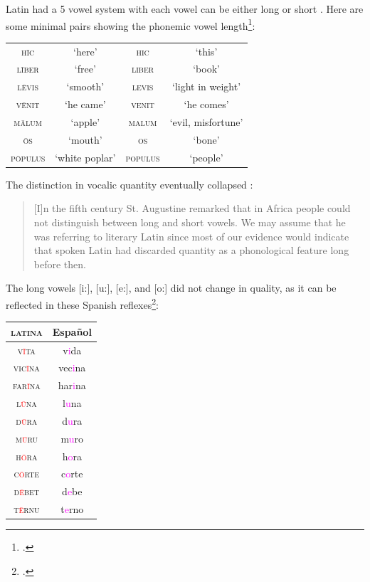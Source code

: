 \documentclass{report}[12pt]
\begin{document}
Latin had a 5 vowel system with each vowel can be either long or short \parencites[p.~6]{romance_his}[p.~44]{penny_spanish}[p.~70]{lloyd_spanish}. Here are some minimal pairs showing the phonemic vowel length\footcite[p.~45]{penny_spanish}:
\begin{center}
  \begin{tabular}{c c c c}
    \textsc{h\={i}c} & `here' & \textsc{hic} & `this' \\
    \textsc{l\={i}ber} & `free' & \textsc{liber} & `book' \\
    \textsc{l\={e}vis} & `smooth' & \textsc{levis} & `light in weight' \\
    \textsc{v\={e}nit} & `he came' & \textsc{venit} & `he comes' \\
    \textsc{m\={a}lum} & `apple' & \textsc{malum} & `evil, misfortune' \\
    \textsc{\={o}s} & `mouth' & \textsc{os} & `bone' \\
    \textsc{p\={o}pulus} & `white poplar' & \textsc{populus} & `people' \\
  \end{tabular}
\end{center}
The distinction in vocalic quantity eventually collapsed \parencite[p.~112]{lloyd_spanish}:
\begin{quote}
  [I]n the fifth century St. Augustine remarked that in Africa people could not distinguish between long and short vowels. We may assume that he was referring to literary Latin since most of our evidence would indicate that spoken Latin had discarded quantity as a phonological feature long before then.
\end{quote}
The long vowels [i:], [u:], [e:], and [o:] did not change in quality, as it can be reflected in these Spanish reflexes\footcite[p.~12]{romance_his}:
\begin{center}
  \begin{tabular}{c c}
    \textsc{latina} & Español \\
    \hline
    \textsc{v\textcolor{red}{\={i}}ta} & v\textcolor{magenta}{i}da \\
    \textsc{vic\textcolor{red}{\={i}}na} & vec\textcolor{magenta}{i}na \\
    \textsc{far\textcolor{red}{\={i}}na} & har\textcolor{magenta}{i}na \\
    \textsc{l\textcolor{red}{\={u}}na} & l\textcolor{magenta}{u}na \\
    \textsc{d\textcolor{red}{\={u}}ra} & d\textcolor{magenta}{u}ra \\
    \textsc{m\textcolor{red}{\={u}}ru} & m\textcolor{magenta}{u}ro \\
    \textsc{h\textcolor{red}{\={o}}ra} & h\textcolor{magenta}{o}ra \\
    \textsc{c\textcolor{red}{\={o}}rte} & c\textcolor{magenta}{o}rte \\
    \textsc{d\textcolor{red}{\={e}}bet} & d\textcolor{magenta}{e}be \\
    \textsc{t\textcolor{red}{\={e}}rnu} & t\textcolor{magenta}{e}rno \\
  \end{tabular}
\end{center}
\end{document}
